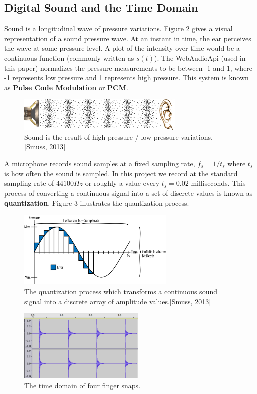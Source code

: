 \documentclass[DIV=calc, paper=a4, fontsize=11pt, twocolumn]{scrartcl}   %
\begin{document}
\subsection{Digital Sound and the Time Domain}
Sound is a longitudinal wave of pressure variations. Figure 2 gives a visual representation of a sound pressure wave. At an instant in time, the ear perceives the wave at some pressure level. A plot of the intensity over time would be a continuous function (commonly written as $s(t)$). The WebAudioApi (used in this paper) normalizes the pressure measurements to be between -1 and 1, where -1 represents low pressure and 1 represents high pressure. This system is known as \textbf{Pulse Code Modulation} or \textbf{PCM}.

\begin{figure}[h]
\centering
\includegraphics[width=80mm]{figures/pressure_wave.png}
\caption{Sound is the result of high pressure / low pressure variations. [Smuss, 2013]}
\label{overflow}
\end{figure}

\par A microphone records sound samples at a fixed sampling rate, $ f_s = 1/t_s $ where $t_s$ is how often the sound is sampled. In this project we record at the standard sampling rate of
 $44100Hz$ or roughly a value every $t_s =0.02$ milliseconds. This process of converting a continuous signal into a set of discrete values is known as \textbf{quantization}. Figure 3 illustrates the quantization process.

 \begin{figure}[h]
\centering
\includegraphics[width=75mm]{figures/quantization.png}
\caption{The quantization process which transforms a continuous sound signal into a discrete array of amplitude values.[Smuss, 2013]}
\label{overflow}
\end{figure}

\begin{figure}[h]
\centering
\includegraphics[width=60mm]{figures/snap_timedomain.png}
\caption{The time domain of four finger snaps.}
\label{overflow}
\end{figure}
\end{document}
